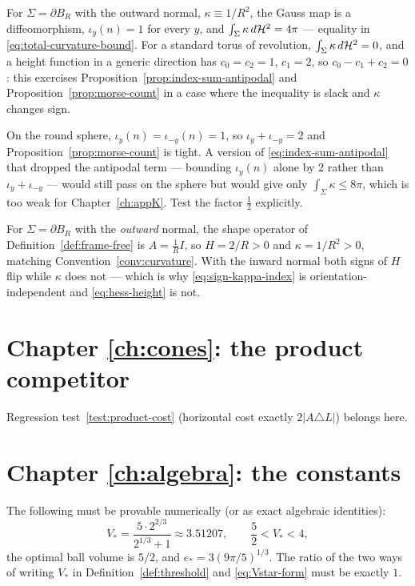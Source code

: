 \begin{test}\label{test:total-curvature}
For $\Sigma=\partial B_R$ with the outward normal, $\kappa\equiv1/R^2$, the
Gauss map is a diffeomorphism, $\iota_y(n)=1$ for every $y$, and
$\int_\Sigma\kappa\,d\mathcal H^2=4\pi$ --- equality in
\eqref{eq:total-curvature-bound}.  For a standard torus of revolution,
$\int_\Sigma\kappa\,d\mathcal H^2=0$, and a height function in a generic direction has
$c_0=c_2=1$, $c_1=2$, so
$c_0-c_1+c_2=0$: this exercises
Proposition~\ref{prop:index-sum-antipodal} and
Proposition~\ref{prop:morse-count} in a case where the inequality is slack and
$\kappa$ changes sign.
\end{test}

\begin{test}\label{test:antipodal}
On the round sphere, $\iota_y(n)=\iota_{-y}(n)=1$, so
$\iota_y+\iota_{-y}=2$ and Proposition~\ref{prop:morse-count} is tight.  A
version of \eqref{eq:index-sum-antipodal} that dropped the antipodal term ---
bounding $\iota_y(n)$ alone by $2$ rather than $\iota_y+\iota_{-y}$ --- would
still pass on the sphere but would give only
$\int_\Sigma\kappa\le8\pi$, which is too weak for
Chapter~\ref{ch:appK}.  Test the factor $\tfrac12$ explicitly.
\end{test}

\begin{test}\label{test:kappa-sign}
For $\Sigma=\partial B_R$ with the \emph{outward} normal, the shape operator
of Definition~\ref{def:frame-free} is $A=\tfrac1RI$, so $H=2/R>0$ and
$\kappa=1/R^2>0$, matching Convention~\ref{conv:curvature}.  With the inward
normal both signs of $H$ flip while $\kappa$ does not --- which is why
\eqref{eq:sign-kappa-index} is orientation-independent and
\eqref{eq:hess-height} is not.
\end{test}

\section{Chapter \ref{ch:cones}: the product competitor}

Regression test~\ref{test:product-cost} (horizontal cost exactly
$2|A\triangle L|$) belongs here.

\section{Chapter \ref{ch:algebra}: the constants}

\begin{test}\label{test:constants}
The following must be provable numerically (or as exact algebraic identities):
\[
  V_*=\frac{5\cdot2^{2/3}}{2^{1/3}+1}\approx3.51207,
  \qquad
  \frac52<V_*<4,
\]
the optimal ball volume is $5/2$, and
$e_*=3(9\pi/5)^{1/3}$.  The ratio of the two ways of writing $V_*$ in
Definition~\ref{def:threshold} and \eqref{eq:Vstar-form} must be exactly $1$.
\end{test}

